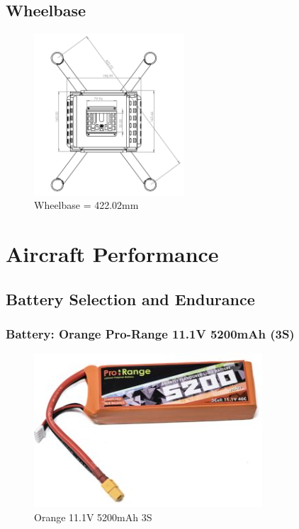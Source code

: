 \documentclass[12pt]{report}
\begin{document}
      \subsection*{Wheelbase}
      \begin{figure}[h]
        \centering 
        \includegraphics[width=0.5\textwidth]{wheelbase.png}
        \caption{Wheelbase = 422.02mm} 
        \label{fig:wheelbase}
      \end{figure}

      \clearpage

        
    \section{Aircraft Performance}
      \subsection{Battery Selection and Endurance}
      \subsubsection{\large Battery: Orange Pro-Range 11.1V 5200mAh (3S)} 
      \begin{figure}
        \includegraphics[width=1\linewidth]{battery.png}
        \caption{Orange 11.1V 5200mAh 3S}
        \label{fig:battery3s}
      \end{figure}
     
\end{document}
